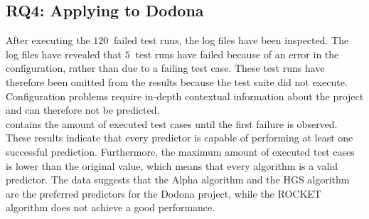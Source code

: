 \subsection{RQ4: Applying \tcp{} to Dodona}
After executing the $\SI{120}{}$ failed test runs, the log files have been inspected. The log files have revealed that $\SI{5}{}$ test runs have failed because of an error in the configuration, rather than due to a failing test case. These test runs have therefore been omitted from the results because the test suite did not execute. Configuration problems require in-depth contextual information about the project and can therefore not be predicted.\\

\noindent {} contains the amount of executed test cases until the first failure is observed. These results indicate that every predictor is capable of performing at least one successful prediction. Furthermore, the maximum amount of executed test cases is lower than the original value, which means that every algorithm is a valid predictor. The data suggests that the Alpha algorithm and the HGS algorithm are the preferred predictors for the Dodona project, while the ROCKET algorithm does not achieve a good performance.

